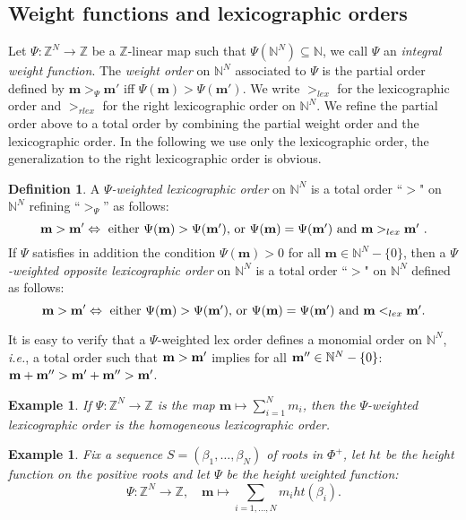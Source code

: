 \documentclass{emsprocart}
\newtheorem{exam}[theorem]{Example}
\theoremstyle{definition}
\newtheorem{definition}[theorem]{Definition}
\begin{document}
\subsection{Weight functions and lexicographic orders}\label{lexmonorder} Let $\Psi: \mathbb Z^N\rightarrow \mathbb Z$
be a $\mathbb Z$-linear map such that $\Psi(\mathbb N^N)\subseteq \mathbb N$, we call $\Psi$
an  {\it integral weight function}. The {\it weight order} on $\mathbb N^N$ associated to $\Psi$ is the partial
order defined by $\mathbf m>_{\Psi} \mathbf m'$ iff $\Psi(\mathbf m)>\Psi(\mathbf m')$.
We write $>_{lex}$ for the lexicographic order and $>_{rlex}$
for the right lexicographic order on $\mathbb N^N$.
We refine the partial order above to a total order by combining the partial weight order
and the lexicographic order. In the following we use only
the lexicographic order, the generalization to the right lexicographic order is obvious.
\begin{definition}\label{weightorder}
A {\it $\Psi$-weighted lexicographic order} on
$\mathbb N^N$ is a total order ``$>$" on $\mathbb N^N$ refining ``$>_{\Psi}$'' as follows:
$$
\mathbf m>\mathbf m'\Leftrightarrow \hbox{\ either $\Psi(\mathbf m)> \Psi(\mathbf m')$, or
$\Psi(\mathbf m)=\Psi(\mathbf m')$ and $\mathbf m>_{lex}\mathbf m'$ }.
$$
If $\Psi$ satisfies in addition the condition $\Psi(\mathbf m)>0$ for all $\mathbf m\in \mathbb N^N-\{0\}$,
then a {\it $\Psi$-weighted opposite lexicographic order} on
$\mathbb N^N$ is a total order ``$>$" on $\mathbb N^N$ defined as follows:
$$
\mathbf m>\mathbf m'\Leftrightarrow \hbox{\ either $\Psi(\mathbf m)> \Psi(\mathbf m')$, or
$\Psi(\mathbf m)=\Psi(\mathbf m')$ and $\mathbf m<_{lex}\mathbf m'$}.
$$
\end{definition}
It is easy to verify that a $\Psi$-weighted lex order defines a monomial order on $\mathbb N^N$, \emph{i.e.}, a total order such that $\bf m>m'$ implies for all ${\bf m''}\in \mathbb N^N-\{0\}$: $\bf m+m''>m'+m''>m'$.

\begin{exam}\label{homorder} \rm
If $\Psi:\mathbb Z^N\rightarrow \mathbb Z$ is the map $\mathbf m\mapsto \sum_{i=1}^N m_i$, then the $\Psi$-weighted lexicographic order
is the homogeneous lexicographic order.
\end{exam}
\begin{exam}\label{rootorder} \rm
Fix a sequence $S=(\beta_1,\ldots,\beta_N)$ of roots in $\Phi^+$, let $ht$ be the height function on the positive roots and let
$\Psi$ be the {\it height weighted function}:
$$
\Psi:\mathbb Z^N\rightarrow \mathbb Z,\quad \mathbf m\mapsto \sum_{i=1,\ldots,N} m_i ht(\beta_i).
$$
\end{exam}
\end{document}

